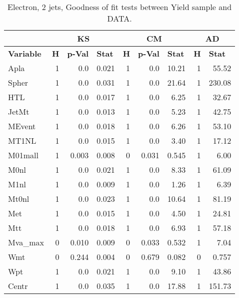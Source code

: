 \begin{table}[htbp] \footnotesize
\caption{Electron, 2 jets, Goodness of fit tests between Yield sample and DATA.}
\begin{center}
\begin{tabular}{|l|r|r|r|r|r|r|r|r|}
\hline
 & \multicolumn{ 3}{c|}{\textbf{KS}} & \multicolumn{ 3}{c|}{\textbf{CM}} & \multicolumn{ 2}{c|}{\textbf{AD}} \\ \hline
\textbf{Variable} & \multicolumn{1}{l|}{\textbf{H}} & \multicolumn{1}{l|}{\textbf{p-Val}} & \multicolumn{1}{l|}{\textbf{Stat}} & \multicolumn{1}{l|}{\textbf{H}} & \multicolumn{1}{l|}{\textbf{p-Val}} & \multicolumn{1}{l|}{\textbf{Stat}} & \multicolumn{1}{l|}{\textbf{H}} & \multicolumn{1}{l|}{\textbf{Stat}} \\ \hline
\textsf{Apla} & 1 & 0.0 & 0.021 & 1 & 0.0 & 10.21 & 1 & 55.52 \\ \hline
\textsf{Spher} & 1 & 0.0 & 0.031 & 1 & 0.0 & 21.64 & 1 & 230.08 \\ \hline
\textsf{HTL} & 1 & 0.0 & 0.017 & 1 & 0.0 & 6.25 & 1 & 32.67 \\ \hline
\textsf{JetMt} & 1 & 0.0 & 0.013 & 1 & 0.0 & 5.23 & 1 & 42.75 \\ \hline
\textsf{MEvent} & 1 & 0.0 & 0.018 & 1 & 0.0 & 6.26 & 1 & 53.10 \\ \hline
\textsf{MT1NL} & 1 & 0.0 & 0.015 & 1 & 0.0 & 3.40 & 1 & 17.12 \\ \hline
\textsf{M01mall} & 1 & 0.003 & 0.008 & 0 & 0.031 & 0.545 & 1 & 6.00 \\ \hline
\textsf{M0nl} & 1 & 0.0 & 0.021 & 1 & 0.0 & 8.33 & 1 & 61.09 \\ \hline
\textsf{M1nl} & 1 & 0.0 & 0.009 & 1 & 0.0 & 1.26 & 1 & 6.39 \\ \hline
\textsf{Mt0nl} & 1 & 0.0 & 0.023 & 1 & 0.0 & 10.64 & 1 & 81.19 \\ \hline
\textsf{Met} & 1 & 0.0 & 0.015 & 1 & 0.0 & 4.50 & 1 & 24.81 \\ \hline
\textsf{Mtt} & 1 & 0.0 & 0.018 & 1 & 0.0 & 6.93 & 1 & 57.18 \\ \hline
\textsf{Mva\_max} & 0 & 0.010 & 0.009 & 0 & 0.033 & 0.532 & 1 & 7.04 \\ \hline
\textsf{Wmt} & 0 & 0.244 & 0.004 & 0 & 0.679 & 0.082 & 0 & 0.757 \\ \hline
\textsf{Wpt} & 1 & 0.0 & 0.021 & 1 & 0.0 & 9.10 & 1 & 43.86 \\ \hline
\textsf{Centr} & 1 & 0.0 & 0.035 & 1 & 0.0 & 17.88 & 1 & 151.73 \\ \hline

\end{tabular}
\end{center}
\end{table}
